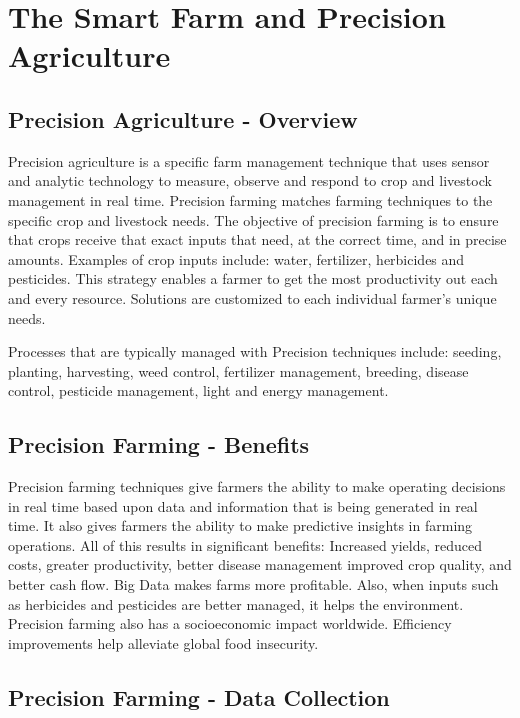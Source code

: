 \documentclass[sigconf]{acmart}
\begin{document}
\section{The Smart Farm and Precision Agriculture}

\subsection{Precision Agriculture - Overview}

Precision agriculture is a specific farm management technique that uses sensor and analytic technology to measure, observe and respond to crop and livestock management in real time. Precision farming matches farming techniques to the specific crop and livestock needs. The objective of precision farming is to ensure that crops receive that exact inputs that need, at the correct time, and in precise amounts. Examples of crop inputs include: water, fertilizer, herbicides and pesticides. This strategy enables a farmer to get the most productivity out each and every resource. Solutions are customized to each individual farmer’s unique needs.

Processes that are typically managed with Precision techniques include: seeding, planting, harvesting, weed control, fertilizer management, breeding, disease control, pesticide management, light and energy management. 

\subsection {Precision Farming - Benefits}

Precision farming techniques give farmers the ability to make operating decisions in real time based upon data and information that is being generated in real time. It also gives farmers the ability to make predictive insights in farming operations. All of this results in significant benefits: Increased yields, reduced costs, greater productivity, better disease management improved crop quality, and better cash flow. Big Data makes farms more profitable. Also, when inputs such as herbicides and pesticides are better managed, it helps the environment. Precision farming also has a socioeconomic impact worldwide. Efficiency improvements help alleviate global food insecurity.

\subsection{Precision Farming - Data Collection}
\end{document}
